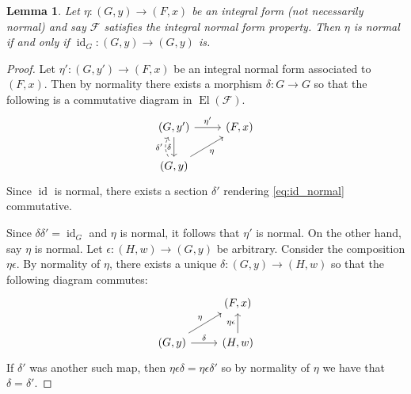 \documentclass[12pt]{article}
\theoremstyle{plain}
\newtheorem{lemma}[thm]{Lemma}
\theoremstyle{definition}
\newcommand{\scr}[1]{\mathscr{#1}}
\newcommand{\lto}{\longrightarrow}
\begin{document}
	\begin{lemma}\label{lem:int_id}
		Let $\eta: (G,y) \lto (F,x)$ be an integral form (not necessarily normal) and say $\scr{F}$ satisfies the integral normal form property. Then $\eta$ is normal if and only if $\operatorname{id}_G: (G, y) \lto (G,y)$ is.
	\end{lemma}
	\begin{proof}
		Let $\eta': (G, y') \lto (F,x)$ be an integral normal form associated to $(F,x)$. Then by normality there exists a morphism $\delta: G \lto G$ so that the following is a commutative diagram in $\operatorname{El}(\scr{F})$.
		\begin{equation}\label{eq:id_normal}
			\begin{tikzcd}
				(G, y')\arrow[d,swap,"{\delta}"]\arrow[r,"{\eta'}"] & (F,x)\\
				(G,y)\arrow[ur,swap,"{\eta}"]\arrow[u,bend left, dashed, "{\delta'}"]
				\end{tikzcd}
			\end{equation}
		Since $\operatorname{id}$ is normal, there exists a section $\delta'$ rendering \eqref{eq:id_normal} commutative.
		
		Since $\delta \delta' = \operatorname{id}_G$ and $\eta$ is normal, it follows that $\eta'$ is normal. On the other hand, say $\eta$ is normal. Let $\epsilon: (H, w) \lto (G,y)$ be arbitrary. Consider the composition $\eta \epsilon$. By normality of $\eta$, there exists a unique $\delta: (G, y) \lto (H, w)$ so that the following diagram commutes:
		\begin{equation}
			\begin{tikzcd}
				& (F,x)\\
				(G,y)\arrow[ur, "{\eta}"]\arrow[r,"{\delta}"] & (H,w)\arrow[u,"{\eta \epsilon}"]
				\end{tikzcd}
			\end{equation}
		If $\delta'$ was another such map, then $\eta \epsilon \delta = \eta \epsilon \delta'$ so by normality of $\eta$ we have that $\delta = \delta'$.
	\end{proof}
	
\end{document}
